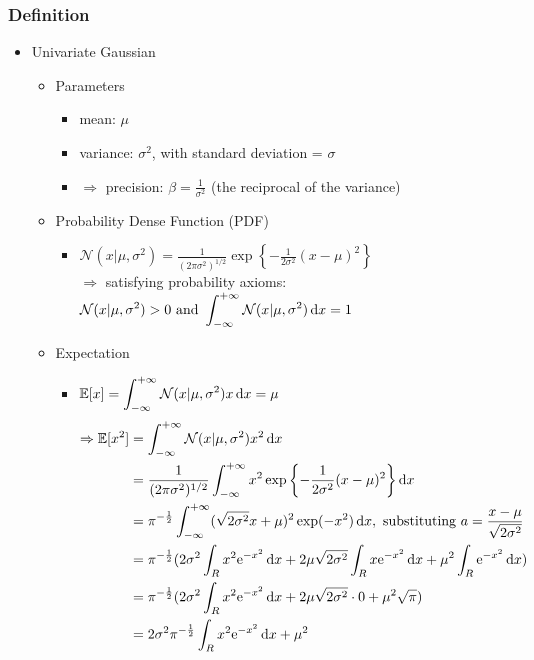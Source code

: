 \subsubsection{Definition}
\begin{itemize}
\item Univariate Gaussian
	\begin{itemize}
	\item Parameters
		\begin{itemize}
		\item mean: $\mu$
		\item variance: $\sigma^2$, with standard deviation = $\sigma$ 
		\item $\Rightarrow$ precision: $\beta = \frac 1 {\sigma^2}$ (the reciprocal of the variance)
		\end{itemize}
	\item Probability Dense Function (PDF)
		\begin{itemize}
		\item $\displaystyle \mathcal N(x|\mu, \sigma^2) = \frac 1 {(2\pi \sigma^2)^{1/2}} \exp \left\{ -\frac 1 {2\sigma^2}(x-\mu)^2 \right\}$ \\
		$\Rightarrow$ satisfying probability axioms: $\displaystyle \mathcal N(x|\mu,\sigma^2)>0 \text{ and } \int_{-\infty}^{+\infty} \mathcal N (x|\mu,\sigma^2) \mathop{}\!\mathrm{d} x = 1$
		\end{itemize}
	\item Expectation
		\begin{itemize}
		\item $\displaystyle \mathbb{E}[x] = \int_{-\infty}^{+\infty}\mathcal{N}(x|\mu, \sigma^2)x\mathop{}\!\mathrm{d} x=\mu$
		\begin{align*}
		\Rightarrow \displaystyle \mathbb E [x^2] &= \int_{-\infty}^{+\infty} \mathcal{N}(x|\mu, \sigma^2)x^2\D x \\ 
		&= \frac 1 {(2\pi \sigma^2)^{1/2}} \int_{-\infty}^{+\infty} x^2 \exp \left\{ -\frac 1 {2\sigma^2}(x-\mu)^2 \right\} \D x \\ 
		&= \pi^{-\frac 12} \int_{-\infty}^{+\infty} (\sqrt{2\sigma^2}x+\mu)^2 \exp(-x^2) \D x, \text{ substituting } a=\frac{x-\mu}{\sqrt{2\sigma^2}} \\ 
		&= \pi^{-\frac 12} (2\sigma^2\int_R x^2 {\rm e}^{-x^2}\D x + 2\mu\sqrt{2\sigma^2}\int_R x {\rm e}^{-x^2}\D x + \mu^2 \int_R {\rm e}^{-x^2}\D x ) \\ 
		&= \pi^{-\frac 12} ( 2\sigma^2\int_R x^2 {\rm e}^{-x^2}\D x + 2\mu\sqrt{2\sigma^2}\cdot 0 + \mu^2\sqrt\pi ) \\ 
		&= 2\sigma^2\pi^{-\frac 12}\int_R x^2 {\rm e}^{-x^2}\D x + \mu^2 \\ 

\end{align*}
\end{itemize}
\end{itemize}
\end{itemize}
